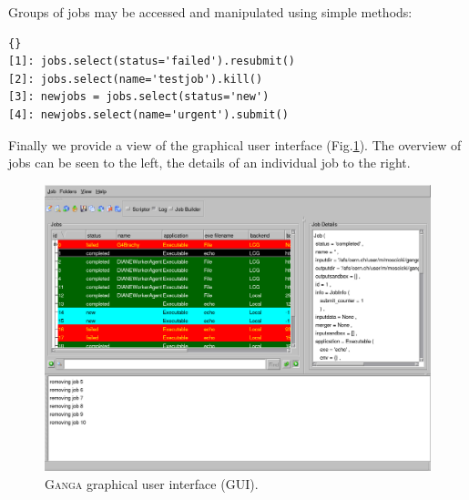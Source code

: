 \documentclass{elsart}
\def\ganga {\textsc{Ganga}\xspace}
\begin{document}
\vspace{-2ex}

Groups of jobs may be accessed and manipulated using simple methods:

\tiny
\begin{lstlisting}[escapechar=!]{}
[1]: jobs.select(status='failed').resubmit()
[2]: jobs.select(name='testjob').kill()
[3]: newjobs = jobs.select(status='new')
[4]: newjobs.select(name='urgent').submit()
\end{lstlisting}
\normalsize

\vspace{-2ex}

Finally we provide a view of the graphical user interface
(Fig.\ref{fig:GUI}). The overview of jobs can be seen to the left, the
details of an individual job to the right.

\begin{figure}[ht!]
  \centering
  \includegraphics[width=1 \textwidth]{ganga-GUI.png}
  \caption{\ganga graphical user interface (GUI). }
  \label{fig:GUI}
\end{figure}
\end{document}

